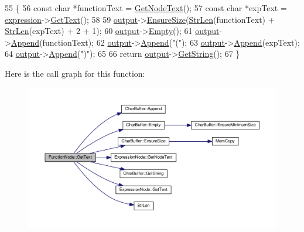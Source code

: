 \begin{DoxyCode}
55 \{
56     \textcolor{keyword}{const} \textcolor{keywordtype}{char} *functionText = \hyperlink{classExpressionNode_a42a5e9562b0f645a19dcc83f698069b5}{GetNodeText}();
57     \textcolor{keyword}{const} \textcolor{keywordtype}{char} *expText = \hyperlink{classFunctionNode_ad7577b179a1937aaf8a0058bb5b546dc}{expression}->\hyperlink{classExpressionNode_a0bbf243108a14eaf963a8161ffd8eb92}{GetText}();
58 
59     \hyperlink{classSyntaxNode_a1180628cbe3fce43930cee0df5a9ce5c}{output}->\hyperlink{classCharBuffer_ad1907009b5ad136692b989fa96bf2f7e}{EnsureSize}(\hyperlink{clib_8h_a67ec56eb98b49515d35005a5b3bf9a32}{StrLen}(functionText) + \hyperlink{clib_8h_a67ec56eb98b49515d35005a5b3bf9a32}{StrLen}(expText) + 2 + 1);
60     \hyperlink{classSyntaxNode_a1180628cbe3fce43930cee0df5a9ce5c}{output}->\hyperlink{classCharBuffer_abe39d3fd7d8b9c8ec343af2cae7adc96}{Empty}();
61     \hyperlink{classSyntaxNode_a1180628cbe3fce43930cee0df5a9ce5c}{output}->\hyperlink{classCharBuffer_a045b38735f7b3007c1b98d3d7b7feafe}{Append}(functionText);
62     \hyperlink{classSyntaxNode_a1180628cbe3fce43930cee0df5a9ce5c}{output}->\hyperlink{classCharBuffer_a045b38735f7b3007c1b98d3d7b7feafe}{Append}(\textcolor{stringliteral}{"("});
63     \hyperlink{classSyntaxNode_a1180628cbe3fce43930cee0df5a9ce5c}{output}->\hyperlink{classCharBuffer_a045b38735f7b3007c1b98d3d7b7feafe}{Append}(expText);
64     \hyperlink{classSyntaxNode_a1180628cbe3fce43930cee0df5a9ce5c}{output}->\hyperlink{classCharBuffer_a045b38735f7b3007c1b98d3d7b7feafe}{Append}(\textcolor{stringliteral}{")"});
65 
66     \textcolor{keywordflow}{return} \hyperlink{classSyntaxNode_a1180628cbe3fce43930cee0df5a9ce5c}{output}->\hyperlink{classCharBuffer_a7dfd3feaaf80f318ba44efe15b1ec44b}{GetString}();
67 \}
\end{DoxyCode}


Here is the call graph for this function\+:\nopagebreak
\begin{figure}[H]
\begin{center}
\leavevmode
\includegraphics[width=350pt]{classFunctionNode_a86b42caf0a4019d8f594dc994bb094e7_cgraph}
\end{center}
\end{figure}


